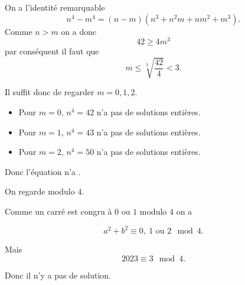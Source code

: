 \begin{sol}
  On a l'identité remarquable
  $$n^4 - m^4 = (n-m)(n^3+n^2 m + n m^2 + m^3).$$
  Comme $n > m$ on a donc
  $$42 \geq 4m^3$$
  par conséquent il faut que
  $$m \leq \sqrt[3]{\frac{42}{4}} < 3.$$

  Il suffit donc de regarder $m = 0,1,2$.

  \begin{itemize}
    \item Pour $m=0$, $n^4 = 42$ n'a pas de solutions entières.
    \item Pour $m=1$, $n^4 = 43$ n'a pas de solutions entières.
    \item Pour $m=2$, $n^4 = 50$ n'a pas de solutions entières.
  \end{itemize}

  Donc l'équation n'a .
\end{sol}

\begin{sol}
  On regarde modulo $4$.

  Comme un carré est congru à $0$ ou $1$ modulo $4$ on a

  $$a^2 + b^2 \equiv 0,~1 \text{ ou } 2 \mod 4.$$

  Mais $$2023 \equiv 3 \mod 4.$$

  Donc il n'y a pas de solution.
\end{sol}

